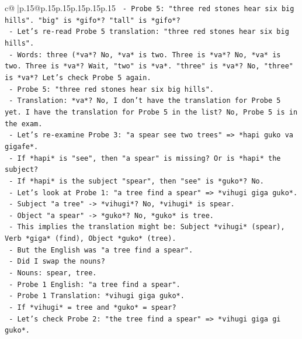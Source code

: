 \documentclass{article}
\begin{document}
{\begin{supertabular}{c@{$\;$}|p{.15\linewidth}@{}p{.15\linewidth}p{.15\linewidth}p{.15\linewidth}p{.15\linewidth}p{.15\linewidth}}
{{{\texttt{            {-} Probe 5: "three red stones hear six big hills". "big" is *gifo*? "tall" is *gifo*?} \\
\texttt{            {-} Let's re{-}read Probe 5 translation: "three red stones hear six big hills".} \\
\texttt{            {-} Words: three (*va*? No, *va* is two. Three is *va*? No, *va* is two. Three is *va*? Wait, "two" is *va*. "three" is *va*? No, "three" is *va*? Let's check Probe 5 again.} \\
\texttt{            {-} Probe 5: "three red stones hear six big hills".} \\
\texttt{            {-} Translation: *va*? No, I don't have the translation for Probe 5 yet. I have the translation for Probe 5 in the list? No, Probe 5 is in the exam.} \\
\texttt{            {-} Let's re{-}examine Probe 3: "a spear see two trees" => *hapi guko va gigafe*.} \\
\texttt{              {-} If *hapi* is "see", then "a spear" is missing? Or is *hapi* the subject?} \\
\texttt{              {-} If *hapi* is the subject "spear", then "see" is *guko*? No.} \\
\texttt{              {-} Let's look at Probe 1: "a tree find a spear" => *vihugi giga guko*.} \\
\texttt{                {-} Subject "a tree" {-}> *vihugi*? No, *vihugi* is spear.} \\
\texttt{                {-} Object "a spear" {-}> *guko*? No, *guko* is tree.} \\
\texttt{                {-} This implies the translation might be: Subject *vihugi* (spear), Verb *giga* (find), Object *guko* (tree).} \\
\texttt{                {-} But the English was "a tree find a spear".} \\
\texttt{                {-} Did I swap the nouns?} \\
\texttt{                {-} Nouns: spear, tree.} \\
\texttt{                {-} Probe 1 English: "a tree find a spear".} \\
\texttt{                {-} Probe 1 Translation: *vihugi giga guko*.} \\
\texttt{                {-} If *vihugi* = tree and *guko* = spear?} \\
\texttt{                {-} Let's check Probe 2: "the tree find a spear" => *vihugi giga gi guko*.} \\
}}}
\end{supertabular}}
\end{document}
